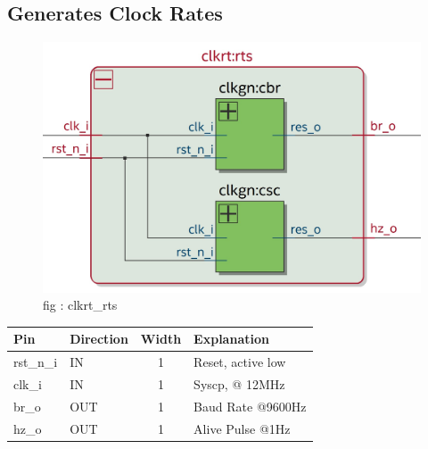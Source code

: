 \documentclass[12pt,a4 paper] {report}
\begin{document}
\subsection{Generates Clock Rates}
\begin{figure}[h]
	\centering
	\includegraphics[scale=0.3]{../png/clkrt_rts.png}
	\newline
	fig : clkrt\_rts \\
\end{figure}

\begin{center}
	\begin{tabular}{| p{2cm} | p{2cm} | c| p{4cm} |}
		\hline
		Pin & Direction & Width & Explanation\\
		\hline	
		rst\_n\_i & IN & 1 &  Reset, active low\\
		\hline
		clk\_i & IN & 1 & Syscp, @ 12MHz \\
		\hline
		br\_o & OUT &   1    &  Baud Rate @9600Hz\\
		\hline
		hz\_o  &  OUT &   1  &  Alive Pulse @1Hz\\
		\hline
	\end{tabular}
\end{center}
\newpage
\end{document}
